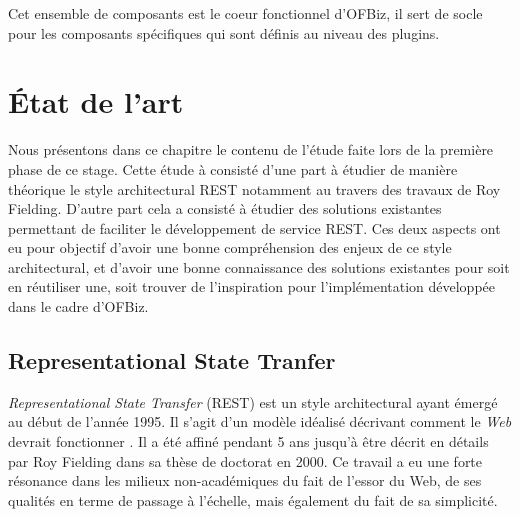 \documentclass[a4paper, 11pt]{report}
\begin{document}
Cet ensemble de composants est le coeur fonctionnel d'OFBiz, il sert
de socle pour les composants spécifiques qui sont définis au niveau
des plugins.

\chapter{État de l'art}

Nous présentons dans ce chapitre le contenu de l'étude faite lors de
la première phase de ce stage. Cette étude à consisté d'une part à
étudier de manière théorique le style architectural REST notamment au
travers des travaux de Roy Fielding. D'autre part cela a consisté à
étudier des solutions existantes permettant de faciliter le
développement de service REST. Ces deux aspects ont eu pour objectif
d'avoir une bonne compréhension des enjeux de ce style architectural,
et d'avoir une bonne connaissance des solutions existantes pour soit
en réutiliser une, soit trouver de l'inspiration pour l'implémentation
développée dans le cadre d'OFBiz.

\section{Representational State Tranfer}

\emph{Representational State Transfer} (REST) est un style
architectural ayant émergé au début de l'année 1995. Il s'agit d'un
modèle idéalisé décrivant comment le \emph{Web} devrait fonctionner
\cite{fielding2002principled}. Il a été affiné pendant 5 ans jusqu'à
être décrit en détails par Roy Fielding dans sa thèse de doctorat
\cite{fielding2000architectural} en 2000. Ce travail a eu une forte
résonance dans les milieux non-académiques du fait de l'essor du Web,
de ses qualités en terme de passage à l'échelle, mais également du
fait de sa simplicité.
\end{document}
